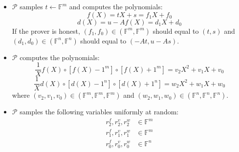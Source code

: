 \begin{itemize}
    \item $\mathcal{P}$ samples $t \leftarrow \mathbb{F}^{m}$ and computes the polynomials:
\begin{equation}
\label{eq:lwe3}
    f(X) = tX+s = f_1 X + f_0
\end{equation}
\begin{equation}
\label{eq:lwe4}
    d(X)=u-Af(X) = d_1 X + d_0
\end{equation}
If the prover is honest, $(f_1, f_0) \in (\mathbb{F}^m, \mathbb{F}^m)$ should equal to $(t, s)$ and $(d_1, d_0) \in (\mathbb{F}^n, \mathbb{F}^n)$ should equal to $(-At, u-As)$.

    \item $\mathcal{P}$ computes the polynomials:
\begin{equation}
\label{eq:lwe1}
    \frac{1}{X} f(X) \circ [f(X) - 1^m] \circ [f(X) + 1^m] = v_2X^2 + v_1X + v_0
\end{equation}
\begin{equation}
\label{eq:lwe2}
    \frac{1}{X} d(X) \circ [d(X) - 1^n] \circ [d(X) + 1^n] = w_2X^2 + w_1X + w_0
\end{equation}
where $(v_2, v_1, v_0) \in (\mathbb{F}^m, \mathbb{F}^m, \mathbb{F}^m)$ and $(w_2, w_1, w_0) \in (\mathbb{F}^n, \mathbb{F}^n, \mathbb{F}^n)$.

    \item $\mathcal{P}$ samples the following variables uniformly at random:
\begin{align*}
    r^f_2, r^v_2, r^w_2 &\in \mathbb{F}^{m} \\
    r^f_1, r^v_1, r^w_1 &\in \mathbb{F}^{m} \\
    r^f_0, r^v_0, r^w_0 &\in \mathbb{F}^{n}
\end{align*}


\end{itemize}
